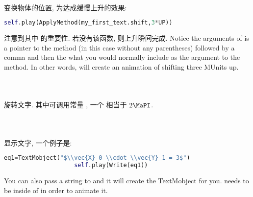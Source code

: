         \paragraph{ \\}
            \hspace*{2em}变换物体的位置, 为达成缓慢上升的效果:
                \begin{lstlisting}[language = {Python}, gobble = 20]
                    self.play(ApplyMethod(my_first_text.shift,3*UP))
                \end{lstlisting}
            注意到其中  的重要性. 若没有该函数, 则上升瞬间完成. Notice the arguments of  is a pointer to the method (in this case  without any parentheses) followed by a comma and then the what you would normally include as the argument to the  method. In other words,  will create an animation of shifting  three MUnits up.

        \paragraph{ \\}
            旋转文字. 其中可调用常量 , 一个  相当于 $2\MaPI$.

        \paragraph{ \\}
            显示文字, 一个例子是:
                \begin{lstlisting}[language = {Python}, gobble = 20]
                    eq1=TextMobject("$\\vec{X}_0 \\cdot \\vec{Y}_1 = 3$")
                    self.play(Write(eq1))
                \end{lstlisting}
            You can also pass a string to  and it will create the TextMobject for you.  needs to be inside of  in order to animate it.

